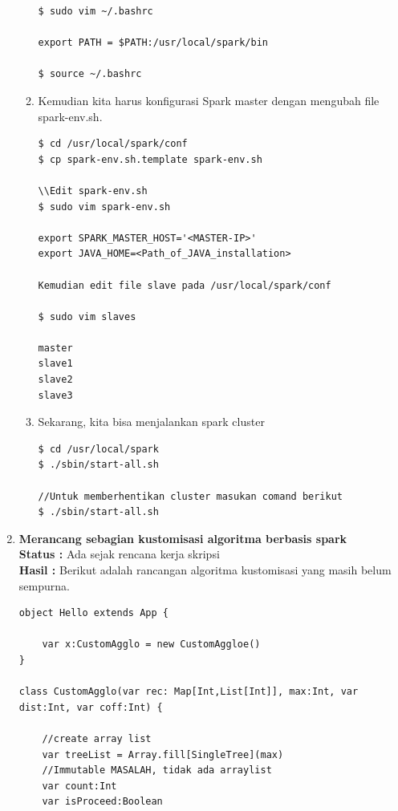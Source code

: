 \documentclass[a4paper,twoside]{article}
\begin{document}
\begin{enumerate}
\begin{enumerate}
\begin{verbatim}
$ sudo vim ~/.bashrc

export PATH = $PATH:/usr/local/spark/bin

$ source ~/.bashrc
\end{verbatim}

\item Kemudian kita harus konfigurasi Spark master dengan mengubah file spark-env.sh.

\begin{verbatim}
$ cd /usr/local/spark/conf
$ cp spark-env.sh.template spark-env.sh

\\Edit spark-env.sh
$ sudo vim spark-env.sh

export SPARK_MASTER_HOST='<MASTER-IP>'
export JAVA_HOME=<Path_of_JAVA_installation>

Kemudian edit file slave pada /usr/local/spark/conf

$ sudo vim slaves

master
slave1
slave2
slave3
\end{verbatim}

\item Sekarang, kita bisa menjalankan spark cluster

\begin{verbatim}
$ cd /usr/local/spark
$ ./sbin/start-all.sh

//Untuk memberhentikan cluster masukan comand berikut
$ ./sbin/start-all.sh
\end{verbatim}


\end{enumerate}


\item \textbf{Merancang sebagian kustomisasi algoritma berbasis spark}\\
		{\bf Status :} Ada sejak rencana kerja skripsi \\
		{\bf Hasil :} Berikut adalah rancangan algoritma kustomisasi yang masih belum sempurna. 

\begin{lstlisting}
object Hello extends App {

	var x:CustomAgglo = new CustomAggloe()
}

class CustomAgglo(var rec: Map[Int,List[Int]], max:Int, var dist:Int, var coff:Int) {

    //create array list
    var treeList = Array.fill[SingleTree](max) 
    //Immutable MASALAH, tidak ada arraylist
    var count:Int
    var isProceed:Boolean


\end{lstlisting}
\end{enumerate}
\end{document}
